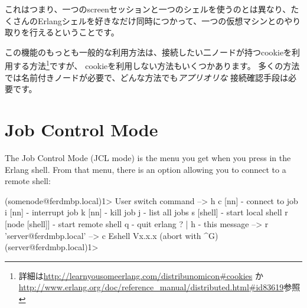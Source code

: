 これはつまり、一つのscreenセッションと一つのシェルを使うのとは異なり、たくさんのErlangシェルを好きなだけ同時につかって、一つの仮想マシンとのやり取りを行えるということです。

この機能のもっとも一般的な利用方法は、接続したい二ノードが持つcookieを利用する方法\footnote{詳細は\href{http://learnyousomeerlang.com/distribunomicon\#cookies}{http://learnyousomeerlang.com/distribunomicon\#cookies} か \href{http://www.erlang.org/doc/reference\_manual/distributed.html\#id83619}{http://www.erlang.org/doc/reference\_manual/distributed.html\#id83619}参照}ですが、
cookieを利用しない方法もいくつかあります。
多くの方法では名前付きノードが必要で、どんな方法でも\emph{アプリオリな} 接続確認手段は必要です。

\section{Job Control Mode}

The Job Control Mode (JCL mode) is the menu you get when you press  in the Erlang shell. From that menu, there is an option allowing you to connect to a remote shell:

\begin{VerbatimEshell}
(somenode@ferdmbp.local)1>
User switch command
 --> h
  c [nn]            - connect to job
  i [nn]            - interrupt job
  k [nn]            - kill job
  j                 - list all jobs
  s [shell]         - start local shell
  r [node [shell]]  - start remote shell
  q                 - quit erlang
  ? | h             - this message
 --> r 'server@ferdmbp.local'
 --> c
Eshell Vx.x.x  (abort with ^G)
(server@ferdmbp.local)1>
\end{VerbatimEshell}

